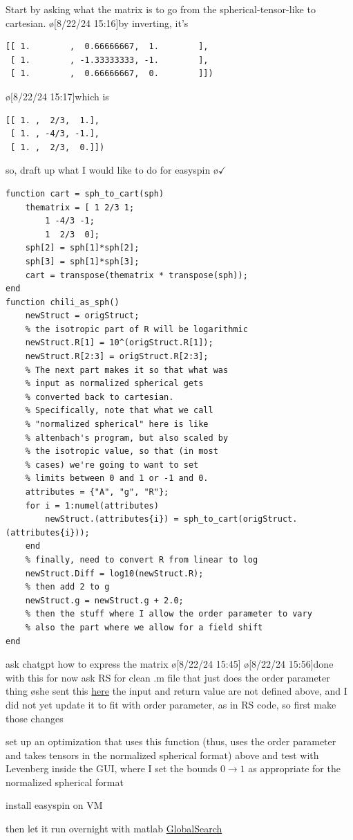 Start by asking what the matrix is to go from the spherical-tensor-like to cartesian.
\o[8/22/24 15:16]{by inverting, it's}
\begin{verbatim}
[[ 1.        ,  0.66666667,  1.        ],
 [ 1.        , -1.33333333, -1.        ],
 [ 1.        ,  0.66666667,  0.        ]])
\end{verbatim}
\o[8/22/24 15:17]{which is}
\begin{verbatim}
[[ 1. ,  2/3,  1.],
 [ 1. , -4/3, -1.],
 [ 1. ,  2/3,  0.]])
\end{verbatim}
so, draft up what I would like to do for easyspin
\o{$\checkmark$}
\begin{verbatim}
function cart = sph_to_cart(sph)
    thematrix = [ 1 2/3 1;
        1 -4/3 -1;
        1  2/3  0];
    sph[2] = sph[1]*sph[2];
    sph[3] = sph[1]*sph[3];
    cart = transpose(thematrix * transpose(sph));
end
function chili_as_sph()
    newStruct = origStruct;
    % the isotropic part of R will be logarithmic
    newStruct.R[1] = 10^(origStruct.R[1]);
    newStruct.R[2:3] = origStruct.R[2:3];
    % The next part makes it so that what was
    % input as normalized spherical gets
    % converted back to cartesian.
    % Specifically, note that what we call
    % "normalized spherical" here is like
    % altenbach's program, but also scaled by
    % the isotropic value, so that (in most
    % cases) we're going to want to set
    % limits between 0 and 1 or -1 and 0.
    attributes = {"A", "g", "R"};
    for i = 1:numel(attributes)
        newStruct.(attributes{i}) = sph_to_cart(origStruct.(attributes{i}));
    end
    % finally, need to convert R from linear to log
    newStruct.Diff = log10(newStruct.R);
    % then add 2 to g
    newStruct.g = newStruct.g + 2.0;
    % then the stuff where I allow the order parameter to vary
    % also the part where we allow for a field shift
end
\end{verbatim}
ask chatgpt how to express the matrix
\o[8/22/24 15:45]{}
\o[8/22/24 15:56]{done with this for now}
ask RS for clean .m file that just does the order parameter thing
\o{she sent
this} \href{https://jmfrancklab.slack.com/archives/C05N2QWL8D8/p1724382675496489?thread_ts=1724355805.081979&cid=C05N2QWL8D8}{here}
the input and return value are not defined
above, and I did not yet update it to fit
with order parameter, as in RS code, so first
make those changes

set up an optimization that uses this
function
(thus, uses the order parameter and takes
tensors in the normalized spherical format)
above and test with Levenberg inside the GUI,
where I set the bounds $0\rightarrow1$ as
appropriate for the normalized spherical
format

install easyspin on VM

then let it run overnight with matlab \href{https://www.mathworks.com/help/gads/globalsearch.html}{GlobalSearch}

